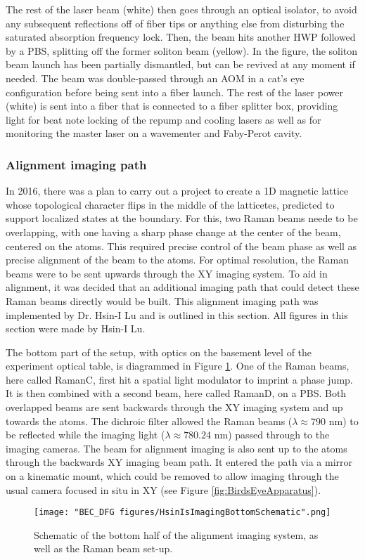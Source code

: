 The rest of the laser beam (white) then goes through an optical isolator, to avoid any subsequent reflections off of fiber tips or anything else from disturbing the saturated absorption frequency lock. Then, the beam hits another HWP followed by a PBS, splitting off the former soliton beam (yellow). In the figure, the soliton beam launch has been partially dismantled, but can be revived at any moment if needed. The beam was double-passed through an AOM in a cat's eye configuration before being sent into a fiber launch. The rest of the laser power (white) is sent into a fiber that is connected to  a fiber splitter box, providing light for beat note locking of the \Rb{} repump and cooling lasers as well as for monitoring the master laser on a wavementer and Faby-Perot cavity. 

\subsubsection{Alignment imaging path}
In 2016, there was a plan to carry out a project to create a 1D magnetic lattice whose topological character flips in the middle of the latticetes, predicted to support localized states at the boundary. For this, two Raman beams neede to be overlapping, with one having a sharp phase change at the center of the beam, centered on the atoms. This required precise control of the beam phase as well as precise alignment of the beam to the atoms. For optimal resolution, the Raman beams were to be sent upwards through the XY imaging system. To aid in alignment, it was decided that an additional imaging path that could detect these Raman beams directly would be built. This alignment imaging path was implemented by Dr. Hsin-I Lu and is outlined in this section. All figures in this section were made by Hsin-I Lu. 

The bottom part of the setup, with optics on the basement level of the experiment optical table, is diagrammed in Figure \ref{fig:HsinIsImagingBottomSchematic}. One of the Raman beams, here called RamanC, first hit a spatial light modulator to imprint a phase jump. It is then combined with a second beam, here called RamanD, on a PBS. Both overlapped beams are sent backwards through the XY imaging system and up towards the atoms. The dichroic filter allowed the Raman beams ($\lambda\approx790$ nm) to be reflected while the imaging light ($\lambda\approx780.24$ nm) passed through to the imaging cameras. The beam for alignment imaging is also sent up to the atoms through the backwards XY imaging beam path. It entered the path via a mirror on a kinematic mount, which could be removed to allow imaging through the usual camera focused in situ in XY (see Figure \ref{fig:BirdsEyeApparatus}). 
\begin{figure}
	\texttt{[image: "BEC\_DFG figures/HsinIsImagingBottomSchematic".png]}
\caption{Schematic of the bottom half of the alignment imaging system, as well as the Raman beam set-up.}
\label{fig:HsinIsImagingBottomSchematic}
\end{figure}

